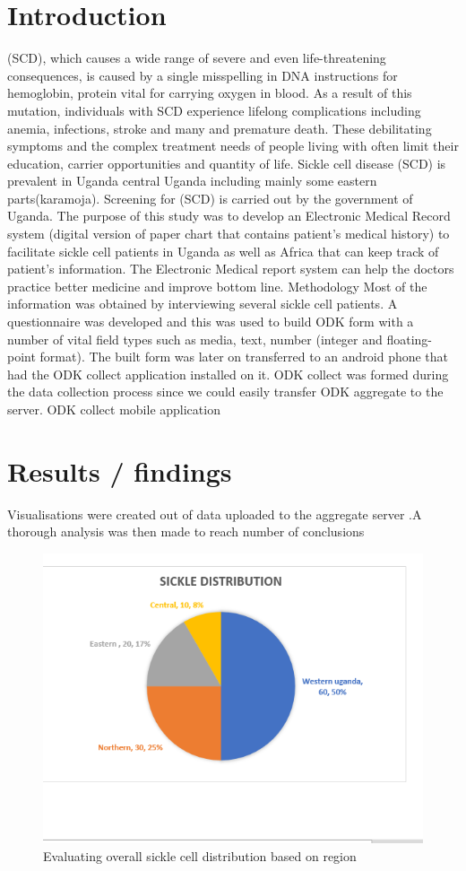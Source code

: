\documentclass[12pt,]{article}
\begin{document}
\section{Introduction}
(SCD), which causes a wide range of severe and even life-threatening consequences, is caused by a single misspelling in DNA instructions for hemoglobin, protein vital for carrying oxygen in blood. As a result of this mutation, individuals with SCD experience lifelong complications including anemia, infections, stroke and many and premature death. These debilitating symptoms and the complex treatment needs of people living with often limit their education, carrier opportunities and quantity of life. Sickle cell disease (SCD) is prevalent in Uganda central Uganda including mainly some eastern parts(karamoja). Screening for (SCD) is carried out by the government of Uganda.    
The purpose of this study was to develop an Electronic Medical Record system (digital version of paper chart that contains patient’s medical history) to facilitate sickle cell patients in Uganda as well as Africa that can keep track of patient’s information. The Electronic Medical report system can help the doctors practice better medicine and improve bottom line.
Methodology
Most of the information was obtained by interviewing several sickle cell patients. A questionnaire was developed and this was used to build ODK form with a number of vital field types such as media, text, number (integer and floating-point format).
The built form was later on transferred to an android phone that had the ODK collect application installed on it. ODK collect was formed during the data collection process since we could easily transfer ODK aggregate to the server.
ODK collect mobile application
\section{Results / findings}
Visualisations were created out of data uploaded to the aggregate server .A thorough analysis was then made to reach number of conclusions 
\begin{figure}
\includegraphics[width=\linewidth]{image 1.png}
\caption{Evaluating overall sickle cell distribution based on region}
\end{figure}
\end{document}
